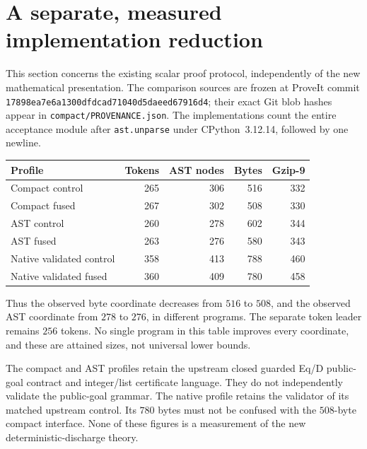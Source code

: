 \section{A separate, measured implementation reduction}
\label{sec:continuation-fusion}

This section concerns the existing scalar proof protocol, independently of
the new mathematical presentation.  The comparison sources are frozen at
ProveIt commit \texttt{17898ea7e6a1300dfdcad71040d5daeed67916d4}; their exact
Git blob hashes appear in \texttt{compact/PROVENANCE.json}.
The implementations count the entire acceptance module after
\texttt{ast.unparse} under CPython~3.12.14, followed by one newline.

\begin{center}
\begin{tabular}{lrrrr}
\hline
Profile & Tokens & AST nodes & Bytes & Gzip-9\\
\hline
Compact control &265&306&516&332\\
Compact fused &267&302&508&330\\
AST control &260&278&602&344\\
AST fused &263&276&580&343\\
Native validated control &358&413&788&460\\
Native validated fused &360&409&780&458\\
\hline
\end{tabular}
\end{center}

Thus the observed byte coordinate decreases from $516$ to $508$, and the
observed AST coordinate from $278$ to $276$, in different programs. The
separate token leader remains $256$ tokens. No single program in this table
improves every coordinate, and these are attained sizes, not universal
lower bounds.

The compact and AST profiles retain the upstream closed guarded Eq/D
public-goal contract and integer/list certificate language. They do not
independently validate the public-goal grammar. The native profile retains
the validator of its matched upstream control. Its $780$ bytes must not be
confused with the $508$-byte compact interface. None of these figures is a
measurement of the new deterministic-discharge theory.

